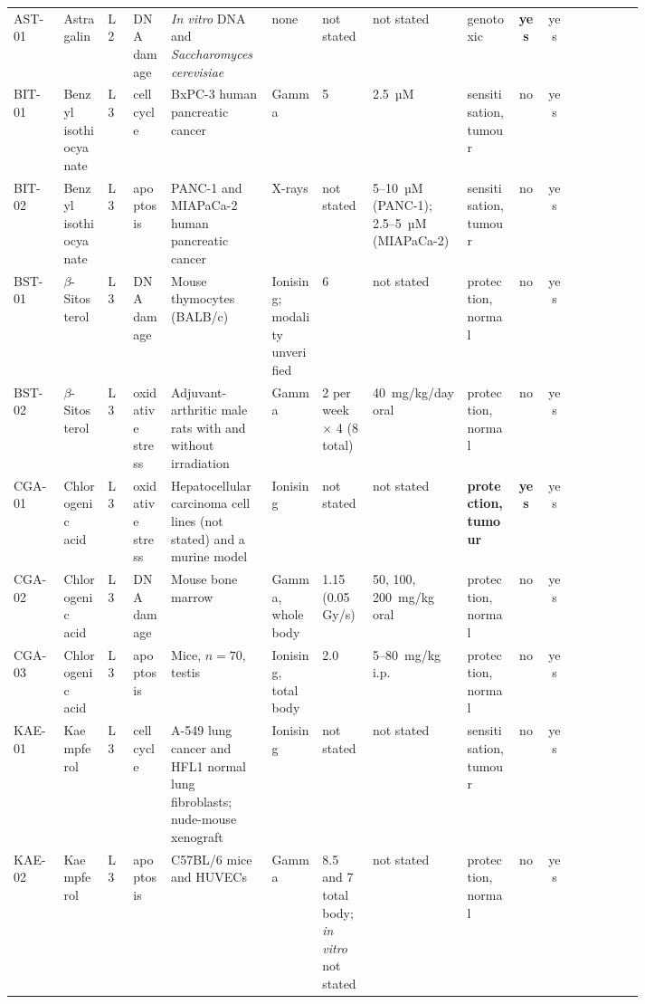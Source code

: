 \begin{landscape}
\begin{longtable}{@{}l L{0.075\linewidth} l L{0.065\linewidth} L{0.16\linewidth}
    L{0.085\linewidth} L{0.085\linewidth} L{0.15\linewidth} L{0.08\linewidth} c c
    L{0.11\linewidth}@{}}
  AST-01 & Astragalin & L2 & DNA damage & \textit{In vitro} DNA and \textit{Saccharomyces
      cerevisiae} & none & not stated & not stated & genotoxic & \textbf{yes} & yes
    &  \\
  BIT-01 & Benzyl isothio\-cyanate & L3 & cell cycle & BxPC-3 human pancreatic cancer & Gamma
    & 5 & 2.5~µM & sensitisation, tumour & no & yes &  \\
  BIT-02 & Benzyl isothio\-cyanate & L3 & apoptosis & PANC-1 and MIAPaCa-2 human pancreatic
      cancer & X-rays & not stated & 5--10~µM (PANC-1); 2.5--5~µM (MIAPaCa-2)
    & sensitisation, tumour & no & yes &  \\
  BST-01 & $\beta$-Sitosterol & L3 & DNA damage & Mouse thymocytes (BALB/c) & Ionising;
      modality unverified & 6 & not stated & protection, normal & no & yes
    &  \\
  BST-02 & $\beta$-Sitosterol & L3 & oxidative stress & Adjuvant-arthritic male rats with and
      without irradiation & Gamma & 2 per week $\times$ 4 (8 total) & 40~mg/kg/day oral
    & protection, normal & no & yes &  \\
  CGA-01 & Chlorogenic acid & L3 & oxidative stress & Hepatocellular carcinoma cell lines (not
      stated) and a murine model & Ionising & not stated & not stated
    & \textbf{protection, tumour} & \textbf{yes} & yes &  \\
  CGA-02 & Chlorogenic acid & L3 & DNA damage & Mouse bone marrow & Gamma, whole body
    & 1.15 (0.05~Gy/s) & 50, 100, 200~mg/kg oral & protection, normal & no & yes
    &  \\
  CGA-03 & Chlorogenic acid & L3 & apoptosis & Mice, $n=70$, testis & Ionising, total body
    & 2.0 & 5--80~mg/kg i.p. & protection, normal & no & yes
    &  \\
  KAE-01 & Kaempferol & L3 & cell cycle & A-549 lung cancer and HFL1 normal lung fibroblasts;
      nude-mouse xenograft & Ionising & not stated & not stated & sensitisation, tumour & no
    & yes &  \\
  KAE-02 & Kaempferol & L3 & apoptosis & C57BL/6 mice and HUVECs & Gamma & 8.5 and 7 total
      body; \textit{in vitro} not stated & not stated & protection, normal & no & yes
    &  \\

\end{longtable}
\end{landscape}
